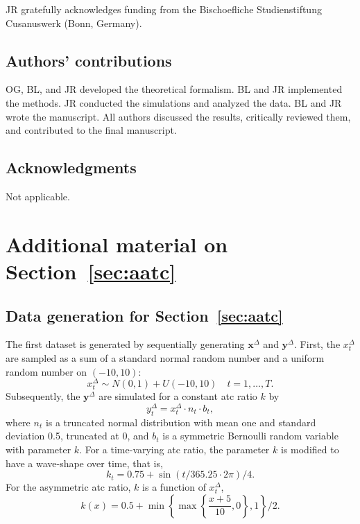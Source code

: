 \documentclass[pdflatex]{sn-jnl}
\theoremstyle{plain}%
\theoremstyle{definition}
\newcommand{\diffx}{\mathbf{x}^{\Delta}}
\newcommand{\diffy}{\mathbf{y}^{\Delta}}
\newcommand{\diffxt}[1][t]{x^{\Delta}_{#1}}
\newcommand{\diffyt}[1][t]{y^{\Delta}_{#1}}
\begin{document}
JR gratefully acknowledges funding from the Bischoefliche Studienstiftung Cusanuswerk (Bonn, Germany).

\subsection*{Authors' contributions}

OG, BL, and JR developed the theoretical formalism.
BL and JR implemented the methods.
JR conducted the simulations and analyzed the data.
BL and JR wrote the manuscript.
All authors discussed the results, critically reviewed them, and contributed to the final manuscript.

\subsection*{Acknowledgments}

Not applicable.

\printbibliography
%

\appendix

\section{Additional material on Section~\ref{sec:aatc}}\label{sec:appendix-atc}

\subsection{Data generation for Section~\ref{sec:aatc}}\label{subsec:app-ATC-data-generation}

The first dataset is generated by sequentially generating $\diffx$ and $\diffy$.
First, the $\diffxt$ are sampled as a sum of a standard normal random number and a uniform random number on $(-10, 10)$:
\begin{equation*}
    \diffxt \sim N(0, 1) + U(-10, 10) \quad t = 1, \dots, T.
\end{equation*}
Subsequently, the $\diffy$ are simulated for a constant \ac{atc} ratio $k$ by
\begin{equation*}
    \diffyt = \diffxt \cdot n_t \cdot b_t,
\end{equation*}
where $n_t$ is a truncated normal distribution with mean one and standard deviation 0.5, truncated at 0, and $b_t$ is a symmetric Bernoulli random variable with parameter $k$.
For a time-varying \ac{atc} ratio, the parameter $k$ is modified to have a wave-shape over time, that is,
\begin{equation*}
    k_t = 0.75 + \sin(t / 365.25 \cdot 2 \pi) / 4.
\end{equation*}
For the asymmetric \ac{atc} ratio, $k$ is a function of $\diffxt$,
\begin{equation*}
    k(x) = 0.5 + \min \left\{ \max \left\{ \frac{x + 5}{10}, 0  \right\} , 1 \right\} / 2.
\end{equation*}
\end{document}
